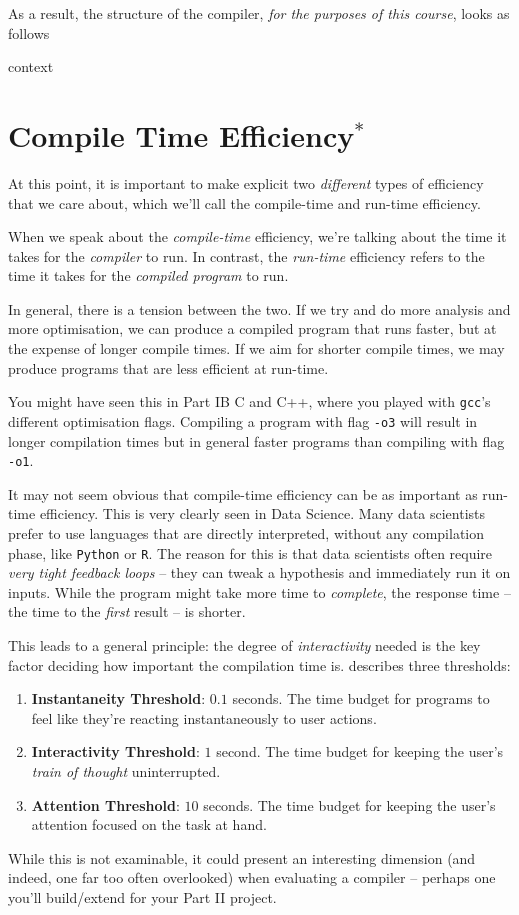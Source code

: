 As a result, the structure of the compiler, \textit{for the purposes of this course}, looks as follows

\begin{center}
    {context}
\end{center}

\section{Compile Time Efficiency$^{*}$}
At this point, it is important to make explicit two \emph{different} types of efficiency that we care about, which we'll call the compile-time and run-time efficiency.

When we speak about the \emph{compile-time} efficiency, we're talking about the time it takes for the \emph{compiler} to run. In contrast, the \emph{run-time} efficiency refers to the time it takes for the \emph{compiled program} to run.

In general, there is a tension between the two. If we try and do more analysis and more optimisation, we can produce a compiled program that runs faster, but at the expense of longer compile times. If we aim for shorter compile times, we may produce programs that are less efficient at run-time.

You might have seen this in {\sffamily Part IB C and C++}, where you played with \texttt{gcc}'s different optimisation flags. Compiling a program with flag \texttt{-o3} will result in longer compilation times but in general faster programs than compiling with flag \texttt{-o1}.

It may not seem obvious that compile-time efficiency can be as important as run-time efficiency. This is very clearly seen in Data Science. Many data scientists prefer to use languages that are directly interpreted, without any compilation phase, like \texttt{Python} or \texttt{R}. The reason for this is that data scientists often require \emph{very tight feedback loops} -- they can tweak a hypothesis and immediately run it on inputs. While the program might take more time to \emph{complete}, the response time -- the time to the \emph{first} result -- is shorter. 

This leads to a general principle: the degree of \emph{interactivity} needed is the key factor deciding how important the compilation time is. \citet{nielsen-1993} describes three thresholds:

\begin{enumerate}
    \item \textbf{Instantaneity Threshold}: $0.1$ seconds. The time budget for programs to feel like they're reacting instantaneously to user actions. 
    \item \textbf{Interactivity Threshold}: $1$ second. The time budget for keeping the user's \emph{train of thought} uninterrupted.
    \item \textbf{Attention Threshold}: $10$ seconds. The time budget for keeping the user's attention focused on the task at hand.
\end{enumerate}

While this is not examinable, it could present an interesting dimension (and indeed, one far too often overlooked) when evaluating a compiler -- perhaps one you'll build/extend for your Part II project.